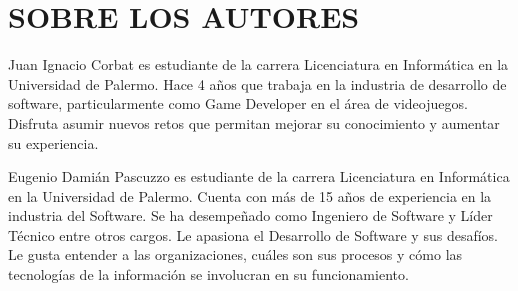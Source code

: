 \documentclass[journal]{IEEEtran}
\begin{document}
\section{SOBRE LOS AUTORES}
Juan Ignacio Corbat es estudiante de la carrera Licenciatura en Informática en la Universidad de Palermo. Hace 4 años que trabaja en la industria de desarrollo de software, particularmente como Game Developer en el área de videojuegos. Disfruta asumir nuevos retos que permitan mejorar su conocimiento y aumentar su experiencia.

Eugenio Damián Pascuzzo es estudiante de la carrera Licenciatura en Informática en la Universidad de Palermo. Cuenta con más de 15 años de experiencia en la industria del Software. Se ha desempeñado como Ingeniero de Software y Líder Técnico entre otros cargos. Le apasiona el Desarrollo de Software y sus desafíos. Le gusta entender a las organizaciones, cuáles son sus procesos y cómo las tecnologías de la información se involucran en su funcionamiento.
\end{document}
